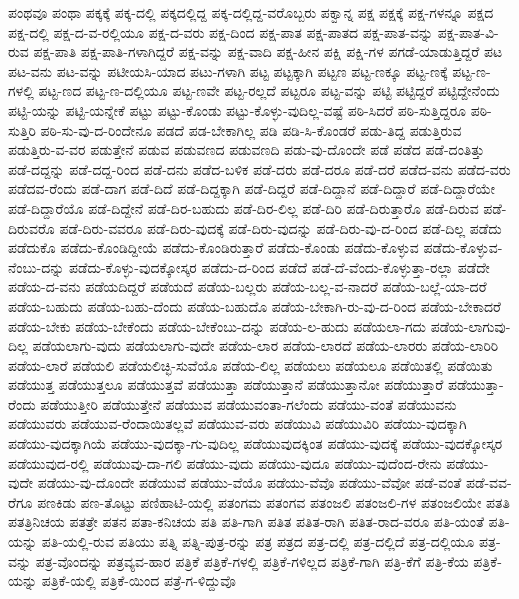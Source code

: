 {ಪಂಥವೂ
ಪಂಥಾ
ಪಕ್ಕಕ್ಕೆ
ಪಕ್ಕ-ದಲ್ಲಿ
ಪಕ್ಕದಲ್ಲಿದ್ದ
ಪಕ್ಕ-ದಲ್ಲಿದ್ದ-ವರೊಬ್ಬರು
ಪಕ್ವಾನ್ನ
ಪಕ್ಷ
ಪಕ್ಷಕ್ಕೆ
ಪಕ್ಷ-ಗಳನ್ನೂ
ಪಕ್ಷದ
ಪಕ್ಷ-ದಲ್ಲಿ
ಪಕ್ಷ-ದ-ವ-ರಲ್ಲಿಯೂ
ಪಕ್ಷ-ದ-ವರು
ಪಕ್ಷ-ದಿಂದ
ಪಕ್ಷ-ಪಾತ
ಪಕ್ಷ-ಪಾತದ
ಪಕ್ಷ-ಪಾತ-ವನ್ನು
ಪಕ್ಷ-ಪಾತ-ವಿ-ರುವ
ಪಕ್ಷ-ಪಾತಿ
ಪಕ್ಷ-ಪಾತಿ-ಗಳಾಗಿದ್ದರೆ
ಪಕ್ಷ-ವನ್ನು
ಪಕ್ಷ-ವಾದಿ
ಪಕ್ಷ-ಹೀನ
ಪಕ್ಷಿ
ಪಕ್ಷಿ-ಗಳ
ಪಗಡೆ-ಯಾಡುತ್ತಿದ್ದರೆ
ಪಟ
ಪಟ-ವನು
ಪಟ-ವನ್ನು
ಪಟೀಯಸಿ-ಯಾದ
ಪಟು-ಗಳಾಗಿ
ಪಟ್ಟ
ಪಟ್ಟಕ್ಕಾಗಿ
ಪಟ್ಟಣ
ಪಟ್ಟ-ಣಕ್ಕೂ
ಪಟ್ಟ-ಣಕ್ಕೆ
ಪಟ್ಟ-ಣ-ಗಳಲ್ಲಿ
ಪಟ್ಟ-ಣದ
ಪಟ್ಟ-ಣ-ದಲ್ಲಿಯೂ
ಪಟ್ಟ-ಣವೇ
ಪಟ್ಟ-ರಲ್ಲದೆ
ಪಟ್ಟರೂ
ಪಟ್ಟ-ವನ್ನು
ಪಟ್ಟಿ
ಪಟ್ಟಿದ್ದರೆ
ಪಟ್ಟಿದ್ದೇನೆಂದು
ಪಟ್ಟಿ-ಯನ್ನು
ಪಟ್ಟಿ-ಯನ್ನೇಕೆ
ಪಟ್ಟು
ಪಟ್ಟು-ಕೊಂಡು
ಪಟ್ಟು-ಕೊಳ್ಳು-ವುದಿಲ್ಲ-ವಷ್ಟೆ
ಪಠಿ-ಸಿದರೆ
ಪಠಿ-ಸುತ್ತಿದ್ದರೂ
ಪಠಿ-ಸುತ್ತಿರಿ
ಪಠಿ-ಸು-ವು-ದ-ರಿಂದೇನೂ
ಪಡದೆ
ಪಡ-ಬೇಕಾಗಿಲ್ಲ
ಪಡಿ
ಪಡಿ-ಸಿ-ಕೊಂಡರೆ
ಪಡು-ತಿದ್ದ
ಪಡುತ್ತಿರುವ
ಪಡುತ್ತಿರು-ವ-ವರ
ಪಡುತ್ತೇನೆ
ಪಡುವ
ಪಡುವಣದ
ಪಡುವಣದಿ
ಪಡು-ವು-ದೊಂದೇ
ಪಡೆ
ಪಡೆದ
ಪಡೆ-ದಂತಿತ್ತು
ಪಡೆ-ದದ್ದನ್ನು
ಪಡೆ-ದದ್ದ-ರಿಂದ
ಪಡೆ-ದನು
ಪಡೆದ-ಬಳಿಕ
ಪಡೆ-ದರು
ಪಡೆ-ದರೂ
ಪಡೆ-ದರೆ
ಪಡೆದ-ವನು
ಪಡೆದ-ವರು
ಪಡೆದವ-ರೆಂದು
ಪಡೆ-ದಾಗ
ಪಡೆ-ದಿದೆ
ಪಡೆ-ದಿದ್ದಕ್ಕಾಗಿ
ಪಡೆ-ದಿದ್ದರೆ
ಪಡೆ-ದಿದ್ದಾನೆ
ಪಡೆ-ದಿದ್ದಾರೆ
ಪಡೆ-ದಿದ್ದಾರೆಯೇ
ಪಡೆ-ದಿದ್ದಾರೆಯೊ
ಪಡೆ-ದಿದ್ದೇನೆ
ಪಡೆ-ದಿರ-ಬಹುದು
ಪಡೆ-ದಿರ-ಲಿಲ್ಲ
ಪಡೆ-ದಿರಿ
ಪಡೆ-ದಿರುತ್ತಾರೊ
ಪಡೆ-ದಿರುವ
ಪಡೆ-ದಿರುವರೊ
ಪಡೆ-ದಿರು-ವವರೂ
ಪಡೆ-ದಿರು-ವುದಕ್ಕೆ
ಪಡೆ-ದಿರು-ವುದನ್ನು
ಪಡೆ-ದಿರು-ವು-ದ-ರಿಂದ
ಪಡೆ-ದಿಲ್ಲ
ಪಡೆದು
ಪಡೆದುಕೊ
ಪಡೆದು-ಕೊಂಡಿದ್ದೀಯೆ
ಪಡೆದು-ಕೊಂಡಿರುತ್ತಾರೆ
ಪಡೆದು-ಕೊಂಡು
ಪಡೆದು-ಕೊಳ್ಳುವ
ಪಡೆದು-ಕೊಳ್ಳುವ-ನೆಂಬು-ದನ್ನು
ಪಡೆದು-ಕೊಳ್ಳು-ವುದಕ್ಕೋಸ್ಕರ
ಪಡೆದು-ದ-ರಿಂದ
ಪಡೆದೆ
ಪಡೆ-ದೆ-ವೆಂದು-ಕೊಳ್ಳುತ್ತಾ-ರಲ್ಲಾ
ಪಡೆದೇ
ಪಡೆಯ-ದ-ವನು
ಪಡೆಯದಿದ್ದರೆ
ಪಡೆಯದೆ
ಪಡೆಯ-ಬಲ್ಲರು
ಪಡೆಯ-ಬಲ್ಲ-ವ-ನಾದರೆ
ಪಡೆಯ-ಬಲ್ಲೆ-ಯಾ-ದರೆ
ಪಡೆಯ-ಬಹುದು
ಪಡೆಯ-ಬಹು-ದೆಂದು
ಪಡೆಯ-ಬಹುದೊ
ಪಡೆಯ-ಬೇಕಾಗಿ-ರು-ವು-ದ-ರಿಂದ
ಪಡೆಯ-ಬೇಕಾದರೆ
ಪಡೆಯ-ಬೇಕು
ಪಡೆಯ-ಬೇಕೆಂದು
ಪಡೆಯ-ಬೇಕೆಂಬು-ದನ್ನು
ಪಡೆಯ-ಲ-ಹುದು
ಪಡೆಯಲಾ-ಗದು
ಪಡೆಯ-ಲಾಗುವು-ದಿಲ್ಲ
ಪಡೆಯಲಾಗು-ವುದು
ಪಡೆಯಲಾಗು-ವುದೇ
ಪಡೆಯ-ಲಾರ
ಪಡೆಯ-ಲಾರದೆ
ಪಡೆಯ-ಲಾರರು
ಪಡೆಯ-ಲಾರಿರಿ
ಪಡೆಯ-ಲಾರೆ
ಪಡೆಯಲಿ
ಪಡೆಯಲಿಚ್ಛಿ-ಸುವೆಯೊ
ಪಡೆಯ-ಲಿಲ್ಲ
ಪಡೆಯಲು
ಪಡೆಯಲೂ
ಪಡೆಯಿತಲ್ಲಿ
ಪಡೆಯಿತು
ಪಡೆಯುತ್ತ
ಪಡೆಯುತ್ತಲೂ
ಪಡೆಯುತ್ತವೆ
ಪಡೆಯುತ್ತಾ
ಪಡೆಯುತ್ತಾನೆ
ಪಡೆಯುತ್ತಾನೋ
ಪಡೆಯುತ್ತಾರೆ
ಪಡೆಯುತ್ತಾ-ರೆಂದು
ಪಡೆಯುತ್ತೀರಿ
ಪಡೆಯುತ್ತೇನೆ
ಪಡೆಯುವ
ಪಡೆಯುವಂತಾ-ಗಲೆಂದು
ಪಡೆಯು-ವಂತೆ
ಪಡೆಯುವನು
ಪಡೆಯುವರು
ಪಡೆಯುವ-ರೆಂದಾಯಿತಲ್ಲವೆ
ಪಡೆಯುವ-ವರು
ಪಡೆಯುವಿ
ಪಡೆಯುವಿರಿ
ಪಡೆಯು-ವುದಕ್ಕಾಗಿ
ಪಡೆಯು-ವುದಕ್ಕಾಗಿಯೆ
ಪಡೆಯು-ವುದಕ್ಕಾ-ಗು-ವುದಿಲ್ಲ
ಪಡೆಯುವುದಕ್ಕಿಂತ
ಪಡೆಯು-ವುದಕ್ಕೆ
ಪಡೆಯು-ವುದಕ್ಕೋಸ್ಕರ
ಪಡೆಯುವುದ-ರಲ್ಲಿ
ಪಡೆಯುವು-ದಾ-ಗಲಿ
ಪಡೆಯು-ವುದು
ಪಡೆಯು-ವುದೂ
ಪಡೆಯು-ವುದೆಂದ-ರೇನು
ಪಡೆಯು-ವುದೇ
ಪಡೆಯು-ವು-ದೊಂದೇ
ಪಡೆಯುವೆ
ಪಡೆಯು-ವೆಯೊ
ಪಡೆಯು-ವೆವೊ
ಪಡೆಯು-ವೆವೋ
ಪಡೆ-ವಂತೆ
ಪಡೆ-ವವ-ರೆಗೂ
ಪಣಕಿಡು
ಪಣ-ತೊಟ್ಟು
ಪಣಿಹಾಟಿ-ಯಲ್ಲಿ
ಪತಂಗಮ
ಪತಂಗವ
ಪತಂಜಲಿ
ಪತಂಜಲಿ-ಗಳ
ಪತಂಜಲಿಯೇ
ಪತತಿ
ಪತತ್ರಿನಿಚಯ
ಪತತ್ರೇ
ಪತನ
ಪತಾ-ಕನಿಚಯ
ಪತಿ
ಪತಿ-ಗಾಗಿ
ಪತಿತ
ಪತಿತ-ರಾಗಿ
ಪತಿತ-ರಾದ-ವರೂ
ಪತಿ-ಯಂತೆ
ಪತಿ-ಯನ್ನು
ಪತಿ-ಯಲ್ಲಿ-ರುವ
ಪತಿಯು
ಪತ್ನಿ
ಪತ್ನಿ-ಪುತ್ರ-ರನ್ನು
ಪತ್ರ
ಪತ್ರದ
ಪತ್ರ-ದಲ್ಲಿ
ಪತ್ರ-ದಲ್ಲಿದೆ
ಪತ್ರ-ದಲ್ಲಿಯೂ
ಪತ್ರ-ವನ್ನು
ಪತ್ರ-ವೊಂದನ್ನು
ಪತ್ರವ್ಯವ-ಹಾರ
ಪತ್ರಿಕೆ
ಪತ್ರಿಕೆ-ಗಳಲ್ಲಿ
ಪತ್ರಿಕೆ-ಗಳಿಲ್ಲದ
ಪತ್ರಿಕೆ-ಗಾಗಿ
ಪತ್ರಿ-ಕೆಗೆ
ಪತ್ರಿ-ಕೆಯ
ಪತ್ರಿಕೆ-ಯನ್ನು
ಪತ್ರಿಕೆ-ಯಲ್ಲಿ
ಪತ್ರಿಕೆ-ಯಿಂದ
ಪತ್ರೆ-ಗ-ಳಿದ್ದುವೊ
}

